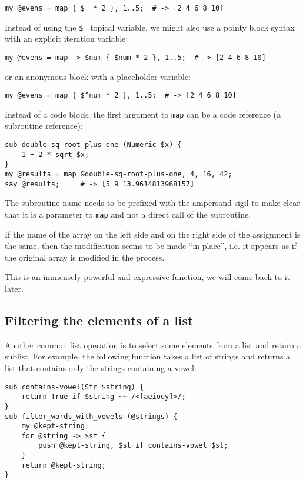 \begin{verbatim}
my @evens = map { $_ * 2 }, 1..5;  # -> [2 4 6 8 10]
\end{verbatim}
%

Instead of using the \verb'$_' topical variable, we might 
also use a pointy block syntax with an explicit iteration 
variable:

\begin{verbatim}
my @evens = map -> $num { $num * 2 }, 1..5;  # -> [2 4 6 8 10]
\end{verbatim}
%

or an anonymous block with a placeholder variable:

\begin{verbatim}
my @evens = map { $^num * 2 }, 1..5;  # -> [2 4 6 8 10]
\end{verbatim}
%

Instead of a code block, the first argument to {\tt map} can 
be a code reference (a subroutine reference):

\begin{verbatim}
sub double-sq-root-plus-one (Numeric $x) { 
    1 + 2 * sqrt $x;
}
my @results = map &double-sq-root-plus-one, 4, 16, 42;
say @results;     # -> [5 9 13.9614813968157]
\end{verbatim}
%

The subroutine name needs to be prefixed with the ampersand 
sigil to make clear that it is a parameter to {\tt map} and 
not a direct call of the subroutine.

If the name of the array on the left side and on the right 
side of the assignment is the same, then the modification 
seems to be made ``in place'', i.e. it appears as if the 
original array is modified in the process.


This is an immensely 
powerful and expressive function, we will come back to it 
later.

\subsection{Filtering the elements of a list}

Another common list operation is to select some elements from
a list and return a sublist.  For example, the following
function takes a list of strings and returns a list that 
contains only the strings containing a vowel:

\begin{verbatim}
sub contains-vowel(Str $string) {
    return True if $string ~~ /<[aeiouy]>/;
}
sub filter_words_with_vowels (@strings) {
    my @kept-string;
    for @string -> $st { 
        push @kept-string, $st if contains-vowel $st;
    }
    return @kept-string;
}  
\end{verbatim}
%

